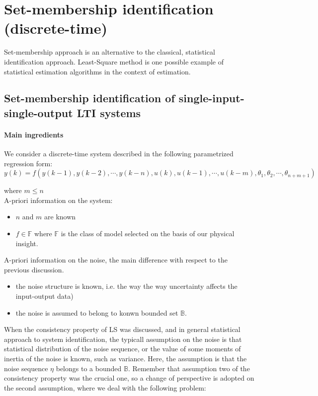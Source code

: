\chapter{Set-membership identification (discrete-time)}    %

Set-membership approach is an alternative to the classical, statistical identification approach. Least-Square method is one possible example of statistical estimation algorithms in the context of estimation.\\
\section{Set-membership identification of single-input-single-output LTI systems}
\subsubsection{Main ingredients}

We consider a discrete-time system described in the following parametrized regression form:\\
\begin{equation}
y(k) = f(y(k-1), y(k-2), \cdots, y(k-n), u(k), u(k-1), \cdots, u(k-m), \theta_1, \theta_2, \cdots, \theta_{n+m+1})
\end{equation}

where \(m\leq n\)\\
A-priori information on the system:
\begin{itemize}
    \item \(n\) and \(m\) are known
    \item \(f \in \mathbb{F}\) where \(\mathbb{F}\) is the class of model selected on the basis of our physical insight. 
\end{itemize}


A-priori information on the noise, the main difference with respect to the previous discussion.
\begin{itemize}
    \item the noise structure is known, i.e. the way the way uncertainty affects the input-output data)
    \item the noise is assumed to belong to konwn bounded set \(\mathbb{B}\).
\end{itemize}

When the consistency property of LS was discussed, and in general statistical approach to system identification, the typicall assumption on the noise is that statistical distribution of the noise sequence, or the value of some moments of inertia of the noise is known, such as variance. Here, the assumption is that the noise sequence \(\eta\) belongs to a bounded \(\mathbb{B}\). Remember that assumption two of the consistency property was the crucial one, so a change of perspective is adopted on the second assumption, where we deal with the following problem:

